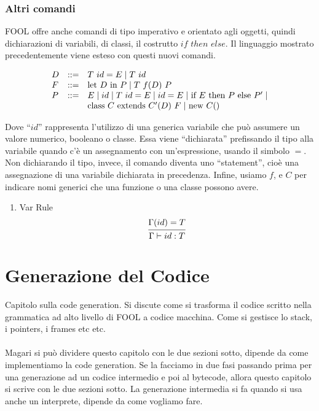 \documentclass{scrreprt}
\begin{document}
\subsection{Altri comandi}

FOOL offre anche comandi di tipo imperativo e orientato agli oggetti, quindi dichiarazioni di variabili, di classi, il costrutto $if$ $then$ $else$.
Il linguaggio mostrato precedentemente viene esteso con questi nuovi comandi.

\[
\begin{array}{lcl}
D & ::= & T$ $id = E \mid T$ $id \\
F & ::= &$let $D$ in $P \mid T$ $f(D)$ $ P\\
P & ::= & E \mid id \mid T$ $id = E \mid id = E \mid $ if $ E $ then $ P $ else $ P' \mid\\
& & $class $C$ extends $C'(D)$ $F \mid $ new $ C()\\ 
\end{array}
\]

Dove ``$id$'' rappresenta l'utilizzo di una generica variabile che può assumere un valore numerico, booleano o classe.
Essa viene ``dichiarata'' prefissando il tipo alla variabile quando c'è un assegnamento con un'espressione, usando il simbolo $=$. Non dichiarando 
il tipo, invece, il comando diventa uno ``statement'', cioè una assegnazione di una variabile dichiarata in precedenza.
Infine, usiamo $f$, e $C$ per indicare nomi generici che una funzione o una classe possono avere.

\begin{multicols}{2}
    \begin{enumerate}
        \item Var Rule
    \[
        \begin{prooftree}
            \hypo {\Gamma(id) = T}
            \infer 1 {\Gamma \vdash id: T}
        \end{prooftree}\\
    \]
    \end{enumerate}
\end{multicols}

\chapter{Generazione del Codice}
Capitolo sulla code generation. Si discute come si trasforma il codice scritto nella grammatica
ad alto livello di FOOL a codice macchina. Come si gestisce lo stack, i pointers, i frames etc etc.\\
\\
Magari si può dividere questo capitolo con le due sezioni sotto, dipende da come implementiamo la code 
generation. Se la facciamo in due fasi passando prima per una generazione ad un codice intermedio e 
poi al bytecode, allora questo capitolo si scrive con le due sezioni sotto.
La generazione intermedia si fa quando si usa anche un interprete, dipende da come vogliamo fare.
\end{document}
